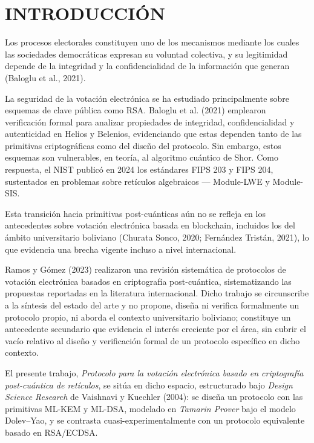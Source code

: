 \section{INTRODUCCIÓN}
Los procesos electorales constituyen uno de los mecanismos mediante los cuales las sociedades democráticas expresan su voluntad colectiva, y su legitimidad depende de la integridad y la confidencialidad de la información que generan (Baloglu et al., 2021).

La seguridad de la votación electrónica se ha estudiado principalmente sobre esquemas de clave pública como RSA. Baloglu et al. (2021) emplearon verificación formal para analizar propiedades de integridad, confidencialidad y autenticidad en Helios y Belenios, evidenciando que estas dependen tanto de las primitivas criptográficas como del diseño del protocolo. Sin embargo, estos esquemas son vulnerables, en teoría, al algoritmo cuántico de Shor. Como respuesta, el NIST publicó en 2024 los estándares FIPS 203 y FIPS 204, sustentados en problemas sobre retículos algebraicos --- Module-LWE y Module-SIS.

Esta transición hacia primitivas post-cuánticas aún no se refleja en los antecedentes sobre votación electrónica basada en blockchain, incluidos los del ámbito universitario boliviano (Churata Sonco, 2020; Fernández Tristán, 2021), lo que evidencia una brecha vigente incluso a nivel internacional.

Ramos y Gómez (2023) realizaron una revisión sistemática de protocolos de votación electrónica basados en criptografía post-cuántica, sistematizando las propuestas reportadas en la literatura internacional. Dicho trabajo se circunscribe a la síntesis del estado del arte y no propone, diseña ni verifica formalmente un protocolo propio, ni aborda el contexto universitario boliviano; constituye un antecedente secundario que evidencia el interés creciente por el área, sin cubrir el vacío relativo al diseño y verificación formal de un protocolo específico en dicho contexto.

El presente trabajo, \textit{Protocolo para la votación electrónica basado en criptografía post-cuántica de retículos}, se sitúa en dicho espacio, estructurado bajo \textit{Design Science Research} de Vaishnavi y Kuechler (2004): se diseña un protocolo con las primitivas ML-KEM y ML-DSA, modelado en \textit{Tamarin Prover} bajo el modelo Dolev--Yao, y se contrasta cuasi-experimentalmente con un protocolo equivalente basado en RSA/ECDSA.
